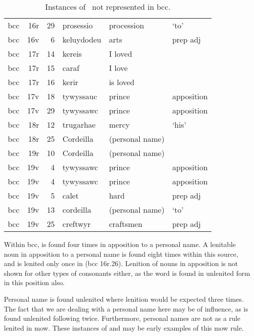 \begin{table}[h]
  \centering
  \begin{tabular}{lddwql}
    \toprule
     &  &  &  &  &  \\
    \midrule
    \gls{bcc} & 16r & 29 & prosessio & procession &  ‘to' \\
    \gls{bcc} & 16v & 6 & keluydodeu & arts & prep adj \\
    \gls{bcc} & 17r & 14 & kereis & I loved &  \\
    \gls{bcc} & 17r & 15 & caraf & I love &  \\
    \gls{bcc} & 17r & 16 & kerir & is loved &  \\
    \gls{bcc} & 17v & 18 & tywyssauc & prince & apposition \\
    \gls{bcc} & 17v & 29 & tywyssawc & prince & apposition \\
    \gls{bcc} & 18r & 12 & trugarhae & mercy &  ‘his' \\
    \gls{bcc} & 18r & 25 & Cordeilla & (personal name) &  \\
    \gls{bcc} & 19r & 10 & Cordeilla & (personal name) &  \\
    \gls{bcc} & 19v & 4 & tywyssawc & prince & apposition \\
    \gls{bcc} & 19v & 4 & tywyssawc & prince & apposition \\
    \gls{bcc} & 19v & 5 & calet & hard & prep adj \\
    \gls{bcc} & 19v & 13 & cordeilla & (personal name) &  ‘to' \\
    \gls{bcc} & 19v & 25 & creftwyr & craftsmen & prep adj \\
    \bottomrule
  \end{tabular}%
  \caption{Instances of \lT\ not represented in \acrshort{bcc}.}
  \label{tab:ltnotrepbcc}
\end{table}

Within \gls{bcc},  is found four times in apposition to a personal name.
A lenitable noun in apposition to a personal name is found eight times within this source, and is lenited only once in  (\gls{bcc} 16r.26).
Lenition of nouns in apposition is not shown for other types of consonants either, as the word  is found in unlenited form in this position also.

Personal name  is found unlenited where lenition would be expected three times. The fact that we are dealing with a personal name here may be of influence, as  is found unlenited following  twice. Furthermore, personal names are not as a rule lenited in \gls{mow}. These instances of  and  may be early examples of this \gls{mow} rule. 

